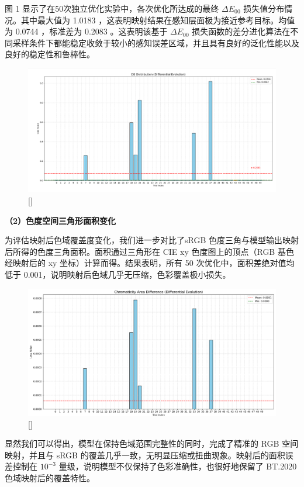 图 1 显示了在50次独立优化实验中，各次优化所达成的最终 $\Delta E_{00}$ 损失值分布情况。其中最大值为 1.0183 ，这表明映射结果在感知层面极为接近参考目标。均值为 0.0744 ，标准差为 0.2083 。这表明该基于 $\Delta E_{00}$ 损失函数的差分进化算法在不同采样条件下都能稳定收敛于较小的感知误差区域，并且具有良好的泛化性能以及良好的稳定性和鲁棒性。
\begin{figure}[h]
\centering
{}
\includegraphics[width=1.0\columnwidth]{figures/DE2000.png}
\bicaption[50次独立优化实验柱状损失图]{}[]{}
\vspace{-10pt}
\label{figure3: 柱状loss}
\end{figure}

\noindent\textbf{（2）色度空间三角形面积变化}

为评估映射后色域覆盖度变化，我们进一步对比了sRGB 色度三角与模型输出映射后所得的色度三角面积。面积通过三角形在 CIE xy 色度图上的顶点（RGB 基色经映射后的 xy 坐标）计算而得。结果表明，所有 50 次优化中，面积差绝对值均低于 0.001，说明映射后色域几乎无压缩，色彩覆盖极小损失。
\begin{figure}[htbp]
\centering
{}
\includegraphics[width=0.8\columnwidth]{figures/面积Loss.png}
\bicaption[50次独立优化实验面积差图]{}[]{}
\vspace{-10pt}
\label{figure3: 面积diff}
\end{figure}
显然我们可以得出，模型在保持色域范围完整性的同时，完成了精准的 RGB 空间映射，并且与 sRGB 的覆盖几乎一致，无明显压缩或扭曲现象。映射后的面积误差控制在 $10^{-3}$ 量级，说明模型不仅保持了色彩准确性，也很好地保留了 BT.2020 色域映射后的覆盖特性。

